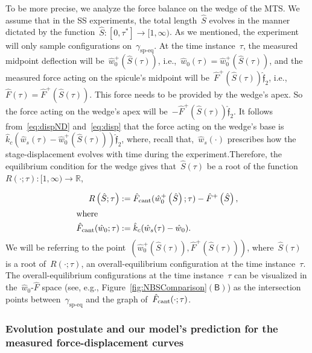 \documentclass[preprint,10pt,times]{elsarticle}
\numberwithin{equation}{section}
\newcommand{\physf}{\hat{\boldsymbol{\mathfrak{f}}}}
\newcommand{\pr}[1]{\left( #1 \right)}
\newcommand{\subf}[1]{\pr{\textsf{#1}}}
\begin{document}
To be more precise, we analyze the force balance on the wedge of the MTS.
We assume that in the SS experiments, the total length~$\hat{S}$
evolves in the manner dictated by the function~$\hat{S}:[0,\tau^*]\to [1,\infty)$.
As we mentioned, the experiment will only sample configurations on~$\gamma_{\text{sp-eq}}$.
At the time instance~$\tau$, the measured midpoint deflection will
be~$\hat{w}_0^{+}\pr{\hat{S}\pr{\tau}}$, i.e.,~$\hat{w}_0(\tau)=\hat{w}_0^{+}\pr{\hat{S}\pr{\tau}}$,
and the measured force acting on the spicule's midpoint will be~$\hat{F}^+\pr{\hat{S}(\tau)}\physf_{2}$,
i.e.,~$\hat{F}(\tau)=\hat{F}^+\pr{\hat{S}(\tau)}$. This force needs
to be provided by the wedge's apex. So the force acting on the wedge's
apex will be~$-\hat{F}^+\pr{\hat{S}(\tau)}\physf_{2}$. It follows
from~\eqref{eq:dispND} and~\eqref{eq:disp} that the force acting
on the wedge's base is~$\hat{k}_{c}\left(\hat{w}_{s}(\tau)-\hat{w}_{0}^+\pr{\hat{S}\pr{\tau}}\right)\physf_2$,
where, recall that,~$\hat{w}_{s}(\cdot)$ prescribes how the stage-displacement
evolves with time during the experiment.Therefore, the equilibrium
condition for the wedge gives that~$\hat{S}(\tau)$ be a root of
the function~$R(\cdot;\tau):[1,\infty)\to\mathbb{R}$,

\begin{subequations}
\begin{align}
R\pr{\hat{S};\tau}&:=\hat{F}_{\rm cant}(\hat{w}_0^{+}\pr{\hat{S}};\tau)-\hat{F}^+\pr{\hat{S}},\\
\intertext{where}
\hat{F}_{\rm cant}(\hat{w}_0;\tau)&:=\hat{k}_c (\hat{w}_s(\tau)-\hat{w}_0).
\label{def:Fcant}
\end{align}
\label{eq:NonDimObliqueLine}
\end{subequations}We will be referring to the point~$\pr{\hat{w}_{0}^{+}\pr{\hat{S}\pr{\tau}},\hat{F}^{+}\pr{\hat{S}\pr{\tau}}}$,
where~$\hat{S}\pr{\tau}$ is a root of~$R(\cdot;\tau)$, an overall-equilibrium
configuration at the time instance~$\tau$. The overall-equilibrium
configurations at the time instance~$\tau$ can be visualized in
the~$\hat{w}_0$-$\hat{F}$ space (see, e.g., Figure~\ref{fig:NBSComparison}$\subf{B}$)
as the intersection points between~$\gamma_{\text{sp-eq}}$ and the
graph of~$\hat{F}_{\rm cant}(\cdot;\tau)$.

\subsubsection{Evolution postulate and our model's prediction for the measured force-displacement
curves\label{subsec:Evolution-postulate-and}}
\end{document}
